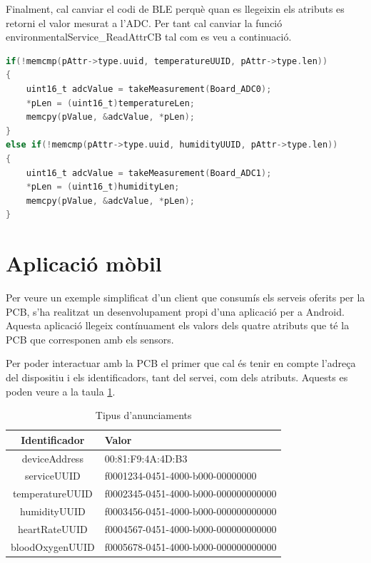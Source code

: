 Finalment, cal canviar el codi de BLE perquè quan es llegeixin els atributs es retorni el valor mesurat a l'ADC.
Per tant cal canviar la funció environmentalService\_ReadAttrCB tal com es veu a continuació.

\begin{lstlisting}[language=C]
  if(!memcmp(pAttr->type.uuid, temperatureUUID, pAttr->type.len))
{
	uint16_t adcValue = takeMeasurement(Board_ADC0);
	*pLen = (uint16_t)temperatureLen;
	memcpy(pValue, &adcValue, *pLen);
}
else if(!memcmp(pAttr->type.uuid, humidityUUID, pAttr->type.len))
{
	uint16_t adcValue = takeMeasurement(Board_ADC1);
	*pLen = (uint16_t)humidityLen;
	memcpy(pValue, &adcValue, *pLen);
}
\end{lstlisting}



\section{Aplicació mòbil}
Per veure un exemple simplificat d'un client que consumís els serveis oferits per la PCB, s'ha realitzat un desenvolupament propi d'una aplicació per a Android.
Aquesta aplicació llegeix contínuament els valors dels quatre atributs que té la PCB que corresponen amb els sensors.

Per poder interactuar amb la PCB el primer que cal és tenir en compte l'adreça del dispositiu i els identificadors, tant del servei, com dels atributs.
Aquests es poden veure a la taula \ref{taula_app}.

\begin{table}[!h]
	\begin{center}
		\begin{tabular}{|c|l|}
			\hline
			Identificador	&	Valor	\\	\hline
			deviceAddress	&	00:81:F9:4A:4D:B3	\\	\hline
			serviceUUID		&	f0001234-0451-4000-b000-00000000		\\	\hline
			temperatureUUID	&	f0002345-0451-4000-b000-000000000000	\\	\hline
			humidityUUID	&	f0003456-0451-4000-b000-000000000000	\\	\hline
			heartRateUUID	&	f0004567-0451-4000-b000-000000000000	\\	\hline
			bloodOxygenUUID	&	f0005678-0451-4000-b000-000000000000	\\	\hline
		\end{tabular}
		\label{taula_app}
	\end{center}
	\caption{Tipus d'anunciaments}
\end{table}

